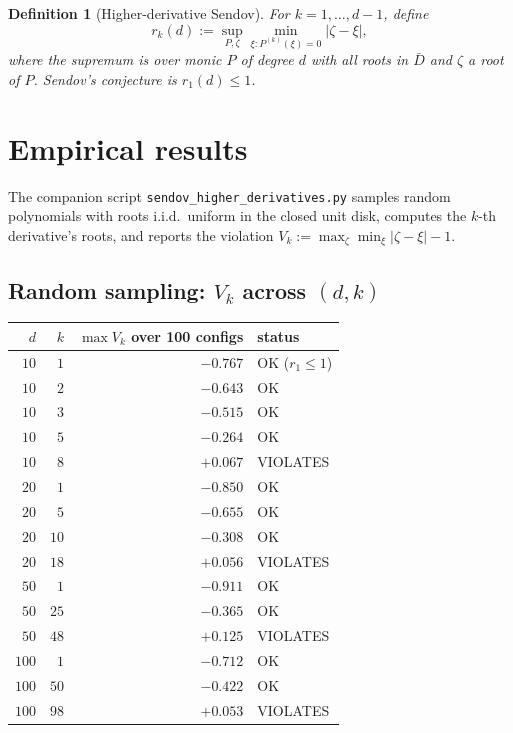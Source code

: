 \documentclass[11pt,a4paper]{article}
\newtheorem{definition}[theorem]{Definition}
\begin{document}
\begin{definition}[Higher-derivative Sendov]
For $k = 1, \ldots, d - 1$, define
\[
r_k(d) := \sup_{P, \zeta} \min_{\xi: P^{(k)}(\xi) = 0} |\zeta - \xi|,
\]
where the supremum is over monic $P$ of degree $d$ with all roots in $\bar{D}$
and $\zeta$ a root of $P$. Sendov's conjecture is $r_1(d) \le 1$.
\end{definition}

\section{Empirical results}\label{sec:numerics}

The companion script \texttt{sendov\_higher\_derivatives.py} samples random
polynomials with roots i.i.d.\ uniform in the closed unit disk, computes
the $k$-th derivative's roots, and reports the violation
$V_k := \max_\zeta \min_\xi |\zeta - \xi| - 1$.

\subsection{Random sampling: $V_k$ across $(d, k)$}

\begin{center}
\begin{tabular}{rrrl}
\toprule
$d$ & $k$ & $\max V_k$ over 100 configs & status \\
\midrule
$10$  & $1$  & $-0.767$ & OK ($r_1 \le 1$) \\
$10$  & $2$  & $-0.643$ & OK \\
$10$  & $3$  & $-0.515$ & OK \\
$10$  & $5$  & $-0.264$ & OK \\
$10$  & $8$  & $\mathbf{+0.067}$ & VIOLATES \\
$20$  & $1$  & $-0.850$ & OK \\
$20$  & $5$  & $-0.655$ & OK \\
$20$  & $10$ & $-0.308$ & OK \\
$20$  & $18$ & $\mathbf{+0.056}$ & VIOLATES \\
$50$  & $1$  & $-0.911$ & OK \\
$50$  & $25$ & $-0.365$ & OK \\
$50$  & $48$ & $\mathbf{+0.125}$ & VIOLATES \\
$100$ & $1$  & $-0.712$ & OK \\
$100$ & $50$ & $-0.422$ & OK \\
$100$ & $98$ & $\mathbf{+0.053}$ & VIOLATES \\
\bottomrule
\end{tabular}
\end{center}
\end{document}
